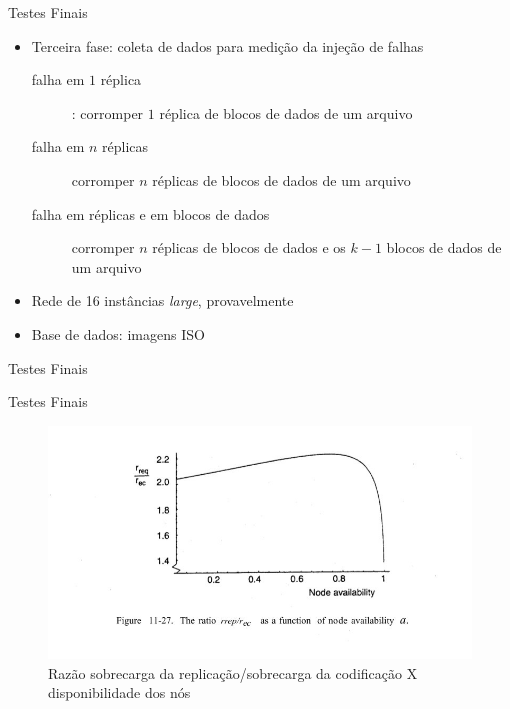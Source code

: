   \begin{frame}{Testes Finais}
     \begin{itemize}
        \item<1-> Terceira fase: coleta de dados para medição da injeção de falhas
           \begin{description}
              \item [falha em $1$ réplica]: corromper $1$ réplica de blocos de dados de um arquivo
              \item [falha em $n$ réplicas] corromper $n$ réplicas de blocos de dados de um arquivo
              \item [falha em réplicas e em blocos de dados] corromper $n$ réplicas de blocos de dados e os $k-1$ blocos de dados de um arquivo
            \end{description}
        \item<2-> Rede de 16 instâncias \emph{large}, provavelmente
        \item<3-> Base de dados: imagens ISO
     \end{itemize}
  \end{frame}

  \begin{frame}{Testes Finais}

     

  \end{frame}

  \begin{frame}{Testes Finais}

        \begin{figure}[hb]
     \centering
     \includegraphics[scale=0.3]{replicationXerasurecoding.jpg}
     \caption{Razão sobrecarga da replicação/sobrecarga da codificação X disponibilidade dos nós~\cite{Tanenbaum:2006}}
     \label{fig11:fb}
   \end{figure}

  \end{frame}
